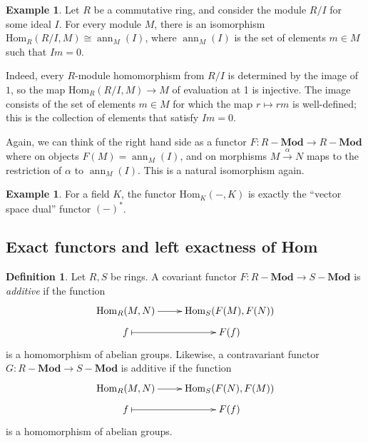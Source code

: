 \documentclass{amsart}[12pt]
\def\ann{\operatorname{ann}}
\newcommand{\Hom}{\mathrm{Hom}}
\newcommand{\DEF}[1]{\emph{#1}\index{#1}}
\numberwithin{equation}{section}
\theoremstyle{plain} %
\theoremstyle{definition}
\newtheorem{defn}[equation]{Definition}
\newtheorem{ex}[equation]{Example}
\theoremstyle{remark}
\newcommand{\ssec}[1]{\subsection{#1}}
\newcommand{\xra}[1]{\xrightarrow{#1}}
\newcommand{\Mod}[1]{#1-\mathbf{Mod}}
\begin{document}
\begin{ex} Let $R$ be a commutative ring, and consider the module $R/I$ for some ideal $I$. For every module $M$, there is an isomorphism $\Hom_R(R/I,M) \cong \ann_M(I)$, where $\ann_M(I)$ is the set of elements $m\in M$ such that $Im=0$.

Indeed, every $R$-module homomorphism from $R/I$ is determined by the image of $1$, so the map $\Hom_R(R/I,M) \to M$ of evaluation at 1 is injective. The image consists of the set of elements $m\in M$ for which the map $r\mapsto rm$ is well-defined; this is the collection of elements that satisfy $Im=0$.

Again, we can think of the right hand side as a functor $F:\Mod{R}\to\Mod{R}$ where  on objects $F(M) = \ann_M(I)$, and on morphisms $M\xra{\alpha} N$ maps to the restriction of $\alpha$ to $\ann_M(I)$. This is a natural isomorphism again.  
\end{ex}

\begin{ex} For a field $K$, the functor $\Hom_K(-,K)$ is exactly the ``vector space dual'' functor $(-)^*$.
\end{ex}

%


\ssec{Exact functors and left exactness of Hom}

\begin{defn} Let $R,S$ be rings. A covariant functor $F:\Mod{R} \to \Mod{S}$ is \DEF{additive} if the function
\[\xymatrix@R=.5em{ \Hom_R(M,N) \ar[r] & \Hom_S(F(M),F(N)) \\ f \ar@{|->}[r] & F(f)}\]
is a homomorphism of abelian groups. Likewise, a contravariant functor $G:\Mod{R} \to \Mod{S}$ is {additive} if the function
\[\xymatrix@R=.5em{ \Hom_R(M,N) \ar[r] & \Hom_S(F(N),F(M)) \\ f \ar@{|->}[r] & F(f)}\]
is a homomorphism of abelian groups.
\end{defn}
\end{document}
